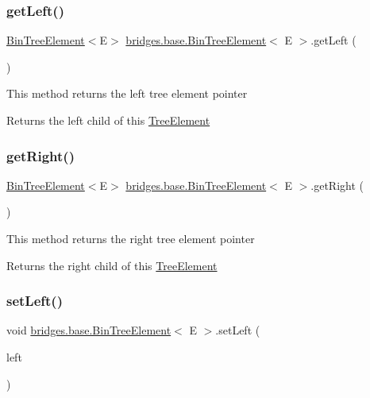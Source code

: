 \subsubsection{\texorpdfstring{getLeft()}{getLeft()}}
{\footnotesize\ttfamily \mbox{\hyperlink{classbridges_1_1base_1_1_bin_tree_element}{Bin\+Tree\+Element}}$<$E$>$ \mbox{\hyperlink{classbridges_1_1base_1_1_bin_tree_element}{bridges.\+base.\+Bin\+Tree\+Element}}$<$ E $>$.get\+Left (\begin{DoxyParamCaption}{ }\end{DoxyParamCaption})}

This method returns the left tree element pointer \begin{DoxyReturn}{Returns}
the left child of this \mbox{\hyperlink{classbridges_1_1base_1_1_tree_element}{Tree\+Element}} 
\end{DoxyReturn}
\mbox{\label{classbridges_1_1base_1_1_bin_tree_element_aa3855c26617ada7248a9d4f83cf455b7}} 
\subsubsection{\texorpdfstring{getRight()}{getRight()}}
{\footnotesize\ttfamily \mbox{\hyperlink{classbridges_1_1base_1_1_bin_tree_element}{Bin\+Tree\+Element}}$<$E$>$ \mbox{\hyperlink{classbridges_1_1base_1_1_bin_tree_element}{bridges.\+base.\+Bin\+Tree\+Element}}$<$ E $>$.get\+Right (\begin{DoxyParamCaption}{ }\end{DoxyParamCaption})}

This method returns the right tree element pointer

\begin{DoxyReturn}{Returns}
the right child of this \mbox{\hyperlink{classbridges_1_1base_1_1_tree_element}{Tree\+Element}} 
\end{DoxyReturn}
\mbox{\label{classbridges_1_1base_1_1_bin_tree_element_a5bcc2c1374a49f7ab2523ce53d204c30}} 
\subsubsection{\texorpdfstring{setLeft()}{setLeft()}}
{\footnotesize\ttfamily void \mbox{\hyperlink{classbridges_1_1base_1_1_bin_tree_element}{bridges.\+base.\+Bin\+Tree\+Element}}$<$ E $>$.set\+Left (\begin{DoxyParamCaption}\item[{\mbox{\hyperlink{classbridges_1_1base_1_1_bin_tree_element}{Bin\+Tree\+Element}}$<$ E $>$}]{left }\end{DoxyParamCaption})}

